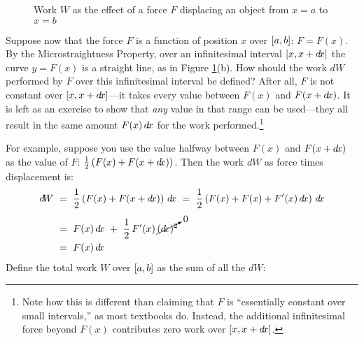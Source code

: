 \begin{figure}[ht]
 \centering
 \qquad\qquad
 \caption[]{\enskip Work $W$ as the effect of a force $F$ displacing an object from $x=a$ to $x=b$}
 \label{fig:work}
\end{figure}

Suppose now that the force $F$ is a function of position $x$ over $\lbrack a,b \rbrack$:
$F=F(x)$. By the Microstraightness Property, over an infinitesimal interval
$\lbrack x,x+d\!x \rbrack$ the curve $y=F(x)$ is a straight line, as in Figure
\ref{fig:work}(b). How should the work $d\!W$ performed by $F$ over this
infinitesimal interval be defined? After all, $F$ is not constant over
$\lbrack x,x+d\!x \rbrack$---it takes every value between $F(x)$ and $F(x+d\!x)$. It is
left as an exercise to show that \emph{any} value in that range can be
used---they all result in the same amount $F(x)\,d\!x$ for the work
performed.\footnote{Note how this is different than claiming that $F$ is
``essentially constant over small intervals,'' as most textbooks do. Instead,
the additional infinitesimal force beyond $F(x)$ contributes zero work over
$\lbrack x,x+d\!x \rbrack$.}

For example, suppose you use the value halfway between $F(x)$ and $F(x+d\!x)$ as
the value of $F$: $\frac{1}{2}\,(F(x)+F(x+d\!x))$. Then the work $d\!W$ as force
times displacement is:
\begin{align*}
d\!W ~&=~ \frac{1}{2}\,(F(x) + F(x+\dx))~\dx ~=~
\frac{1}{2}\,(F(x) + F(x)+ F'(x)\,\dx)~\dx\\[4pt]
&=~ F(x)\,\dx ~+~ \frac{1}{2}\,F'(x)\,\cancelto{0}{(\dx)^2}\\
&=~ F(x)\,\dx
\end{align*}
Define the total work $W$ over $\lbrack a,b \rbrack$ as the sum of all the $d\!W$:

